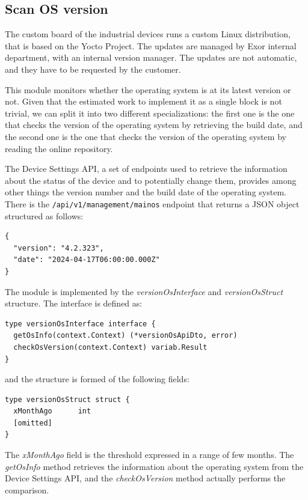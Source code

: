 \subsection{Scan OS version}

The custom board of the industrial devices runs a custom Linux distribution, that is based on the Yocto Project. The updates are managed by Exor internal department, with an internal version manager. The updates are not automatic, and they have to be requested by the customer.

This module monitors whether the operating system is at its latest version or not. Given that the estimated work to implement it as a single block is not trivial, we can split it into two different specializations: the first one is the one that checks the version of the operating system by retrieving the build date, and the second one is the one that checks the version of the operating system by reading the online repository.

The Device Settings API, a set of endpoints used to retrieve the information about the status of the device and to potentially change them, provides among other things the version number and the build date of the operating system. There is the \texttt{/api/v1/management/mainos} endpoint that returns a JSON object structured as follows:

\begin{lstlisting}[style=json]
{
  "version": "4.2.323",
  "date": "2024-04-17T06:00:00.000Z"
}
\end{lstlisting}

The module is implemented by the \textit{versionOsInterface} and \textit{versionOsStruct} structure. The interface is defined as:

\begin{lstlisting}[style=golang]
type versionOsInterface interface {
  getOsInfo(context.Context) (*versionOsApiDto, error)
  checkOsVersion(context.Context) variab.Result
}
\end{lstlisting}

and the structure is formed of the following fields:

\begin{lstlisting}[style=golang]
type versionOsStruct struct {
  xMonthAgo      int
  [omitted]
}
\end{lstlisting}

The \textit{xMonthAgo} field is the threshold expressed in a range of few months. The \textit{getOsInfo} method retrieves the information about the operating system from the Device Settings API, and the \textit{checkOsVersion} method actually performs the comparison.

